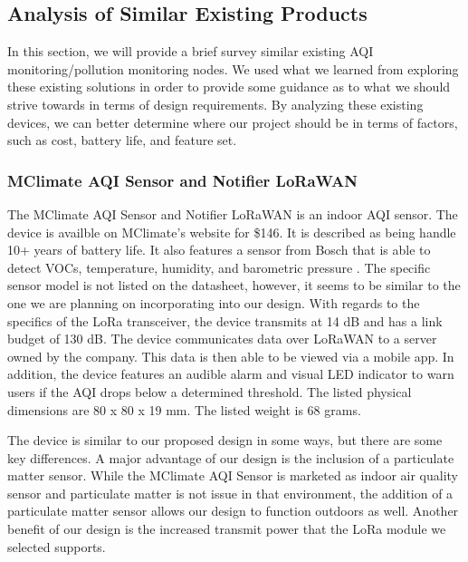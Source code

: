 \subsection{Analysis of Similar Existing Products}
In this section, we will provide a brief survey similar existing AQI monitoring/pollution monitoring nodes. We used what we learned from exploring these existing solutions in order to provide some guidance as to what we should strive towards in terms of design requirements. By analyzing these existing devices, we can better determine where our project should be in terms of factors, such as cost, battery life, and feature set.

\subsubsection{MClimate AQI Sensor and Notifier LoRaWAN}
The MClimate AQI Sensor and Notifier LoRaWAN is an indoor AQI sensor. The device is availble on MClimate's website for \$146. It is described as being handle 10+ years of battery life. It also features a sensor from Bosch that is able to detect VOCs, temperature, humidity, and barometric pressure \cite{mclimate-aqi-sensor}. The specific sensor model is not listed on the datasheet, however, it seems to be similar to the one we are planning on incorporating into our design. With regards to the specifics of the LoRa transceiver, the device transmits at 14 dB and has a link budget of 130 dB. The device communicates data over LoRaWAN to a server owned by the company. This data is then able to be viewed via a mobile app. In addition, the device features an audible alarm and visual LED indicator to warn users if the AQI drops below a determined threshold. The listed physical dimensions are 80 x 80 x 19 mm. The listed weight is 68 grams.

The device is similar to our proposed design in some ways, but there are some key differences. A major advantage of our design is the inclusion of a particulate matter sensor. While the MClimate AQI Sensor is marketed as indoor air quality sensor and particulate matter is not issue in that environment, the addition of a particulate matter sensor allows our design to function outdoors as well. Another benefit of our design is the increased transmit power that the LoRa module we selected supports.


